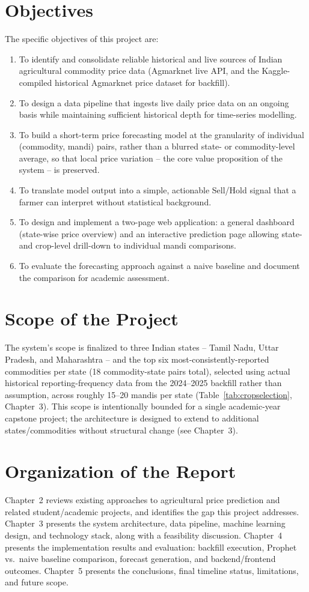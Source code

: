 \section{Objectives}
The specific objectives of this project are:
\begin{enumerate}[label=\arabic*.]
    \item To identify and consolidate reliable historical and live sources
    of Indian agricultural commodity price data (Agmarknet live API, and
    the Kaggle-compiled historical Agmarknet price dataset for backfill).
    \item To design a data pipeline that ingests live daily price data on
    an ongoing basis while maintaining sufficient historical depth for
    time-series modelling.
    \item To build a short-term price forecasting model at the granularity
    of individual (commodity, mandi) pairs, rather than a blurred
    state- or commodity-level average, so that local price variation --
    the core value proposition of the system -- is preserved.
    \item To translate model output into a simple, actionable Sell/Hold
    signal that a farmer can interpret without statistical background.
    \item To design and implement a two-page web application: a
    general dashboard (state-wise price overview) and an interactive
    prediction page allowing state- and crop-level drill-down to
    individual mandi comparisons.
    \item To evaluate the forecasting approach against a naive baseline
    and document the comparison for academic assessment.
\end{enumerate}

\section{Scope of the Project}
The system's scope is finalized to three Indian states -- Tamil Nadu,
Uttar Pradesh, and Maharashtra -- and the top six most-consistently-reported
commodities per state (18 commodity-state pairs total), selected using
actual historical reporting-frequency data from the 2024--2025 backfill
rather than assumption, across roughly 15--20 mandis per state
(Table~\ref{tab:cropselection}, Chapter~3). This scope is intentionally
bounded for a single academic-year capstone project; the architecture is
designed to extend to additional states/commodities without structural
change (see Chapter~3).

\section{Organization of the Report}
Chapter~2 reviews existing approaches to agricultural price prediction and
related student/academic projects, and identifies the gap this project
addresses. Chapter~3 presents the system architecture, data pipeline,
machine learning design, and technology stack, along with a feasibility
discussion. Chapter~4 presents the implementation results and evaluation:
backfill execution, Prophet vs.\ naive baseline comparison, forecast
generation, and backend/frontend outcomes. Chapter~5 presents the
conclusions, final timeline status, limitations, and future scope.
